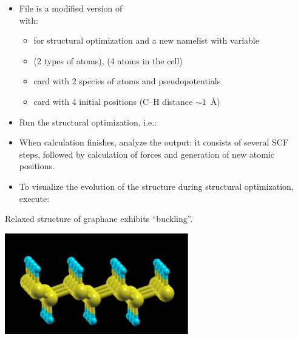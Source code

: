 \documentclass[landscape]{foils}
\begin{document}
\begin{itemize}
\item File  is a modified version of\\
   with:
  \begin{itemize}
  \item {} for structural optimization and a
    new namelist  with variable 
  \item {} (2 types of atoms), 
    (4 atoms in the cell)
  \item {} card with 2 species of atoms and
    pseudopotentials
  \item {} card with 4 initial positions
    (C--H distance $\sim 1$~\AA)
  \end{itemize}
\end{itemize}

\begin{itemize}
\item Run the structural optimization, i.e.:\\[0.5em]
\item When calculation finishes, analyze the output: it consists of
   several SCF steps, followed by calculation of forces and generation
   of new atomic positions.
\item To visualize the evolution of the structure during structural
   optimization, execute:\\[1em]
\end{itemize}
\parbox{15cm}{Relaxed structure of graphane exhibits ``buckling''.}
\hskip 0.5cm \parbox{8cm}{
  \includegraphics[width=8cm]{figs/graphane2.pdf}
}

\end{document}

